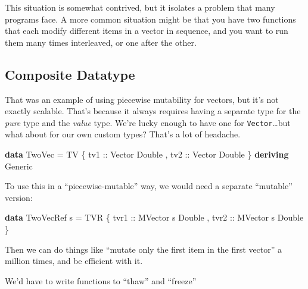 \documentclass[]{article}
\newenvironment{Shaded}{}{}
\newcommand{\DataTypeTok}[1]{\textcolor[rgb]{0.56,0.13,0.00}{#1}}
\newcommand{\KeywordTok}[1]{\textcolor[rgb]{0.00,0.44,0.13}{\textbf{#1}}}
\newcommand{\NormalTok}[1]{#1}
\newcommand{\OtherTok}[1]{\textcolor[rgb]{0.00,0.44,0.13}{#1}}
\begin{document}
This situation is somewhat contrived, but it isolates a problem that many
programs face. A more common situation might be that you have two functions that
each modify different items in a vector in sequence, and you want to run them
many times interleaved, or one after the other.

\subsection{Composite Datatype}\label{composite-datatype}

That was an example of using piecewise mutability for vectors, but it's not
exactly scalable. That's because it always requires having a separate type for
the \emph{pure} type and the \emph{value} type. We're lucky enough to have one
for \texttt{Vector}\ldots but what about for our own custom types? That's a lot
of headache.

\begin{Shaded}
\begin{Highlighting}[]
\KeywordTok{data} \DataTypeTok{TwoVec} \OtherTok{=} \DataTypeTok{TV}\NormalTok{ \{}\OtherTok{ tv1 ::} \DataTypeTok{Vector} \DataTypeTok{Double}
\NormalTok{                 ,}\OtherTok{ tv2 ::} \DataTypeTok{Vector} \DataTypeTok{Double}
\NormalTok{                 \}}
  \KeywordTok{deriving} \DataTypeTok{Generic}
\end{Highlighting}
\end{Shaded}

To use this in a ``piecewise-mutable'' way, we would need a separate ``mutable''
version:

\begin{Shaded}
\begin{Highlighting}[]
\KeywordTok{data} \DataTypeTok{TwoVecRef}\NormalTok{ s }\OtherTok{=} \DataTypeTok{TVR}\NormalTok{ \{}\OtherTok{ tvr1 ::} \DataTypeTok{MVector}\NormalTok{ s }\DataTypeTok{Double}
\NormalTok{                       ,}\OtherTok{ tvr2 ::} \DataTypeTok{MVector}\NormalTok{ s }\DataTypeTok{Double}
\NormalTok{                       \}}
\end{Highlighting}
\end{Shaded}

Then we can do things like ``mutate only the first item in the first vector'' a
million times, and be efficient with it.

We'd have to write functions to ``thaw'' and ``freeze''
\end{document}
